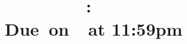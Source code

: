 \documentclass{article}
\title{
    \vspace{2in}
    \textmd{\textbf{\hmwkClass:\ \hmwkTitle}}\\
    \normalsize\vspace{0.1in}\small{Due\ on\ \hmwkDueDate\ at 11:59pm}\\
    \vspace{0.1in}\large{\textit{\hmwkClassInstructor\ \hmwkClassTime}}
    \vspace{3in}
}
\author{\hmwkAuthorName}
\date{}
\begin{document}
\maketitle
\pagebreak
\end{document}
